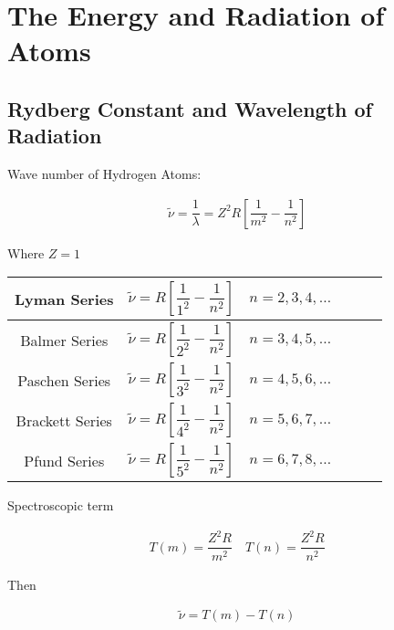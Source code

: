 \chapter{The Energy and Radiation of Atoms}

\section{Rydberg Constant and Wavelength of Radiation}

Wave number of Hydrogen Atoms:

\begin{equation*}
  \begin{aligned}
    \tilde{\nu} = \dfrac{1}{\lambda} = Z^2 R \left[ \dfrac{1}{m^2} - \dfrac{1}{n^2}   \right] 
  \end{aligned}
\end{equation*}

Where $Z = 1$

\begin{table*}[h]
  \centering
  \begin{tabular}{|Sc|Sc|Sc|}
    \hline
    Lyman Series & $\tilde{\nu} = R \left[ \dfrac{1}{1^2} - \dfrac{1}{n^2}   \right]$ & $n=2,3,4,\dots$ \\
    \hline
    Balmer Series & $\tilde{\nu} = R \left[ \dfrac{1}{2^2} - \dfrac{1}{n^2}   \right]$ & $n=3,4,5,\dots$ \\
    \hline
    Paschen Series & $\tilde{\nu} = R \left[ \dfrac{1}{3^2} - \dfrac{1}{n^2}   \right]$ & $n=4,5,6,\dots$ \\
    \hline
    Brackett Series & $\tilde{\nu} = R \left[ \dfrac{1}{4^2} - \dfrac{1}{n^2}   \right]$ & $n=5,6,7,\dots$ \\
    \hline
    Pfund Series & $\tilde{\nu} = R \left[ \dfrac{1}{5^2} - \dfrac{1}{n^2}   \right]$ & $n=6,7,8,\dots$ \\
    \hline
  \end{tabular}
\end{table*}

Spectroscopic term

\begin{equation*}
  \begin{aligned}
    T(m) = \dfrac{Z^2 R}{m^2} \quad
    T(n) = \dfrac{Z^2 R}{n^2}  
  \end{aligned}
\end{equation*}

Then

\begin{equation*}
  \begin{aligned}
    \tilde{\nu} = T \left( m \right) - T \left( n \right)   
  \end{aligned}
\end{equation*}

